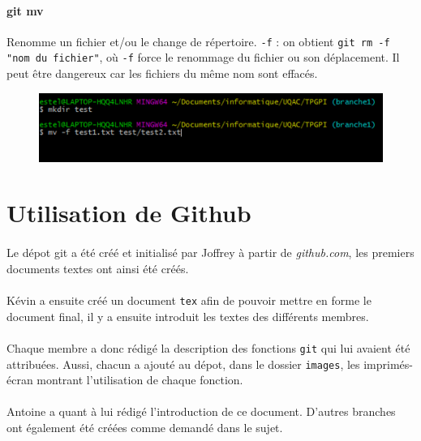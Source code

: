 \documentclass[11pt,canadien]{article}
\begin{document}
\paragraph{git mv}Renomme un fichier et/ou le change de répertoire. \texttt{-f} : on obtient \texttt{git rm -f "nom du fichier"}, où \texttt{-f} force le renommage du fichier ou son déplacement. Il peut être dangereux car les fichiers du même nom sont effacés.
\begin{figure}[H]
	\centering
	\includegraphics{images/git_mv_-f}
\end{figure}

\section{Utilisation de Github}
\paragraph{}Le dépot git a été créé et initialisé par Joffrey à partir de \textit{github.com}, les premiers documents textes ont ainsi été créés.


\paragraph{}Kévin a ensuite créé un document \texttt{tex} afin de pouvoir mettre en forme le document final, il y a ensuite introduit les textes des différents membres.


\paragraph{}Chaque membre a donc rédigé la description des fonctions \texttt{git} qui lui avaient été attribuées. Aussi, chacun a ajouté au dépot, dans le dossier \texttt{images}, les imprimés-écran montrant l'utilisation de chaque fonction.

\paragraph{}Antoine a quant à lui rédigé l'introduction de ce document. D'autres branches ont également été créées comme demandé dans le sujet.
\end{document}
